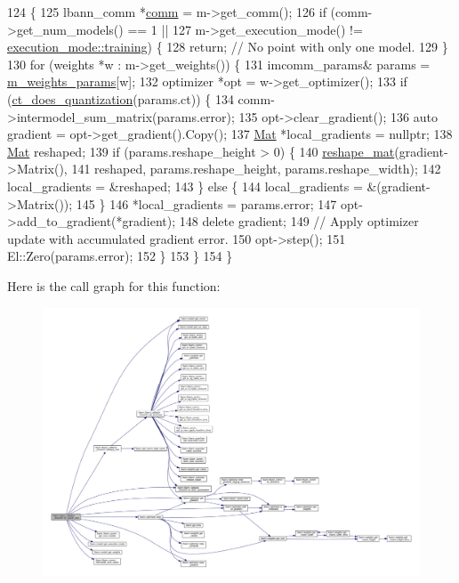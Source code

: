 \begin{DoxyCode}
124                                                  \{
125   lbann\_comm *\hyperlink{file__io_8cpp_ab048c6f9fcbcfaa57ce68b00263dbebe}{comm} = m->get\_comm();
126   \textcolor{keywordflow}{if} (comm->get\_num\_models() == 1 ||
127       m->get\_execution\_mode() != \hyperlink{base_8hpp_a2781a159088df64ed7d47cc91c4dc0a8ac185ddac8b5a8f5aa23c5b80bc12d214}{execution\_mode::training}) \{
128     \textcolor{keywordflow}{return};  \textcolor{comment}{// No point with only one model.}
129   \}
130   \textcolor{keywordflow}{for} (weights *w : m->get\_weights()) \{
131     imcomm\_params& params = \hyperlink{classlbann_1_1lbann__callback__imcomm_a32a0319c91aff324cb3468de4f31dd50}{m\_weights\_params}[w];
132     optimizer *opt = w->get\_optimizer();
133     \textcolor{keywordflow}{if} (\hyperlink{classlbann_1_1lbann__callback__imcomm_a8b29853e49c58cf737a741c503737705}{ct\_does\_quantization}(params.ct)) \{
134       comm->intermodel\_sum\_matrix(params.error);
135       opt->clear\_gradient();
136       \textcolor{keyword}{auto} gradient = opt->get\_gradient().Copy();
137       \hyperlink{base_8hpp_a68f11fdc31b62516cb310831bbe54d73}{Mat} *local\_gradients = \textcolor{keyword}{nullptr};
138       \hyperlink{base_8hpp_a68f11fdc31b62516cb310831bbe54d73}{Mat} reshaped;
139       \textcolor{keywordflow}{if} (params.reshape\_height > 0) \{
140         \hyperlink{classlbann_1_1lbann__callback__imcomm_a13fe710b841f72e28daf8de029f6c2f9}{reshape\_mat}(gradient->Matrix(),
141                     reshaped, params.reshape\_height, params.reshape\_width);
142         local\_gradients = &reshaped;
143       \} \textcolor{keywordflow}{else} \{
144         local\_gradients = &(gradient->Matrix());
145       \}
146       *local\_gradients = params.error;
147       opt->add\_to\_gradient(*gradient);
148       \textcolor{keyword}{delete} gradient;
149       \textcolor{comment}{// Apply optimizer update with accumulated gradient error.}
150       opt->step();
151       El::Zero(params.error);
152     \}
153   \}
154 \}
\end{DoxyCode}
Here is the call graph for this function\+:\nopagebreak
\begin{figure}[H]
\begin{center}
\leavevmode
\includegraphics[width=350pt]{classlbann_1_1lbann__callback__imcomm_a3160dbf536def4f930e0ea0aabdebc11_cgraph}
\end{center}
\end{figure}

